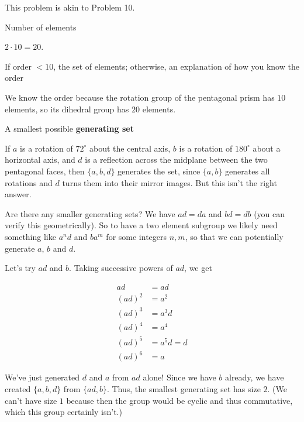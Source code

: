 \documentclass[../key.tex]{subfiles}
\begin{document}
\noindent This problem is akin to Problem 10.

\begin{inner_problem}[start=1]
\item Number of elements
\end{inner_problem}

\noindent$2\cdot 10=20$.

\begin{inner_problem}
\item If order $< 10$, the set of elements; otherwise, an explanation of how you know the order
\end{inner_problem}

\noindent We know the order because the rotation group of the pentagonal prism has $10$ elements, so its dihedral group has $20$ elements.

\begin{inner_problem}
\item A smallest possible \textbf{generating set}
\end{inner_problem}

\noindent If $a$ is a rotation of $72^\circ$ about the central axis, $b$ is a rotation of $180^\circ$ about a horizontal axis, and $d$ is a reflection across the midplane between the two pentagonal faces, then $\{a,b,d\}$ generates the set, since $\{a,b\}$ generates all rotations and $d$ turns them into their mirror images. But this isn't the right answer.

Are there any smaller generating sets? We have $ad=da$ and $bd=db$ (you can verify this geometrically). So to have a two element subgroup we likely need something like $a^nd$ and $ba^m$ for some integers $n,m$, so that we can potentially generate $a$, $b$ and $d$.

Let's try $ad$ and $b$. Taking successive powers of $ad$, we get

\begin{align*}
ad &= ad \\
(ad)^2 &= a^2 \\
(ad)^3 &= a^3d \\
(ad)^4 &= a^4 \\
(ad)^5 &= a^5d = d \\
(ad)^6 &= a
\end{align*}

\noindent We've just generated $d$ and $a$ from $ad$ alone! Since we have $b$ already, we have created $\{a,b,d\}$ from $\{ad,b\}$. Thus, the smallest generating set has size $2$. (We can't have size $1$ because then the group would be cyclic and thus commutative, which this group certainly isn't.)
\end{document}
